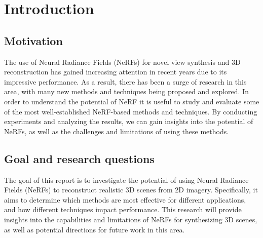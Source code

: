 \chapter{Introduction}

\begin{comment}    
1.1 Motivation

1.2 Goal and research questions
The overall goal of this research is ...
RQ1, RQ2, ...
- Pipeline
- Eksperimenter

1.3 Thesis outline
\end{comment}


\section{Motivation}
The use of Neural Radiance Fields (NeRFs) for novel view synthesis and 3D reconstruction has gained increasing attention in recent years due to its impressive performance. As a result, there has been a surge of research in this area, with many new methods and techniques being proposed and explored. In order to understand the potential of NeRF it is useful to study and evaluate some of the most well-established NeRF-based methods and techniques. By conducting experiments and analyzing the results, we can gain insights into the potential of NeRFs, as well as the challenges and limitations of using these methods.

\section{Goal and research questions}
The goal of this report is to investigate the potential of using Neural Radiance Fields (NeRFs) to reconstruct realistic 3D scenes from 2D imagery. Specifically, it aims to determine which methods are most effective for different applications, and how different techniques impact performance. This research will provide insights into the capabilities and limitations of NeRFs for synthesizing 3D scenes, as well as potential directions for future work in this area.

